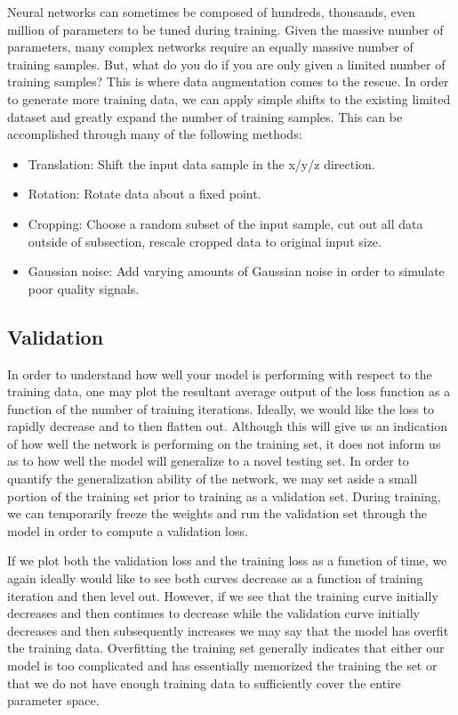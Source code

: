 Neural networks can sometimes be composed of hundreds, thousands, even million of parameters to be tuned during training. Given the massive number of parameters, many complex networks require an equally massive number of training samples. But, what do you do if you are only given a limited number of training samples? This is where data augmentation comes to the rescue. In order to generate more training data, we can apply simple shifts to the existing limited dataset and greatly expand the number of training samples. This can be accomplished through many of the following methods:

\begin{itemize}
    \item Translation: Shift the input data sample in the x/y/z direction.
    \item Rotation: Rotate data about a fixed point.
    \item Cropping: Choose a random subset of the input sample, cut out all data outside of subsection, rescale cropped data to original input size.
    \item Gaussian noise: Add varying amounts of Gaussian noise in order to simulate poor quality signals.
\end{itemize}

%
%
\subsection{Validation}
In order to understand how well your model is performing with respect to the training data, one may plot the resultant average output of the loss function as a function of the number of training iterations. Ideally, we would like the loss to rapidly decrease and to then flatten out. Although this will give us an indication of how well the network is performing on the training set, it does not inform us as to how well the model will generalize to a novel testing set. In order to quantify the generalization ability of the network, we may set aside a small portion of the training set prior to training as a validation set. During training, we can temporarily freeze the weights and run the validation set through the model in order to compute a validation loss. 

If we plot both the validation loss and the training loss as a function of time, we again ideally would like to see both curves decrease as a function of training iteration and then level out. However, if we see that the training curve initially decreases and then continues to decrease while the validation curve initially decreases and then subsequently increases we may say that the model has overfit the training data. Overfitting the training set generally indicates that either our model is too complicated and has essentially memorized the training the set or that we do not have enough training data to sufficiently cover the entire parameter space. 

